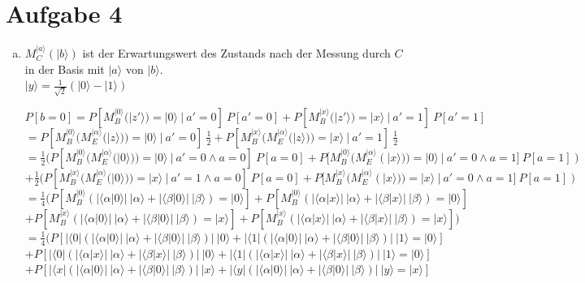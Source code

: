 \documentclass[a4paper]{scrartcl}
\begin{document}
\newpage
\section*{Aufgabe 4}
\begin{enumerate}[a)]

\item $M_C^{|a\rangle}(|b\rangle)$ ist der Erwartungswert des Zustands nach der Messung durch $C$ in der Basis mit $|a\rangle$ von $|b\rangle$.\\
$|y\rangle = \frac{1}{\sqrt{2}} (|0\rangle -|1\rangle)$

$P[b=0] = P[M_B^{|0\rangle}(|z'\rangle)=|0\rangle~|~a'=0]~P[a'=0] + P[M_B^{|x\rangle}(|z'\rangle)=|x\rangle~|~a'=1]~P[a'=1]$\\
$=P[M_B^{|0\rangle}(M_E^{|\alpha \rangle}(|z\rangle))=|0\rangle~|~a'=0]~\frac{1}{2} + P[M_B^{|x\rangle}(M_E^{|\alpha \rangle}(|z\rangle))=|x\rangle~|~a'=1]~\frac{1}{2}$\\
$=\frac{1}{2} (P[M_B^{|0\rangle}(M_E^{|\alpha \rangle}(|0\rangle))=|0\rangle~|~a'=0 \wedge a=0]~P[a=0] + P[M_B^{|0\rangle}(M_E^{|\alpha \rangle}(|x\rangle))=|0\rangle~|~a'=0 \wedge a=1]~P[a=1])$\\
$+\frac{1}{2} (P[M_B^{|x\rangle}(M_E^{|\alpha \rangle}(|0\rangle))=|x\rangle~|~a'=1 \wedge a=0]~P[a=0] + P[M_B^{|x\rangle}(M_E^{|\alpha \rangle}(|x\rangle))=|x\rangle~|~a'=0 \wedge a=1]~P[a=1])$\\
$=\frac{1}{4} (P[M_B^{|0\rangle}(|\langle \alpha|0\rangle|~|\alpha\rangle + |\langle \beta|0\rangle|~|\beta\rangle)=|0\rangle] + P[M_B^{|0\rangle}(|\langle \alpha|x\rangle|~|\alpha\rangle + |\langle \beta|x\rangle|~|\beta\rangle)=|0\rangle]$\\
$+ P[M_B^{|x\rangle}(|\langle \alpha|0\rangle|~|\alpha\rangle + |\langle \beta|0\rangle|~|\beta\rangle)=|x\rangle] + P[M_B^{|x\rangle}(|\langle \alpha|x\rangle|~|\alpha\rangle + |\langle \beta|x\rangle|~|\beta\rangle)=|x\rangle])$\\
$=\frac{1}{4} (P[|\langle 0|(|\langle \alpha|0\rangle|~|\alpha\rangle + |\langle \beta|0\rangle|~|\beta\rangle)|~|0\rangle + |\langle 1|(|\langle \alpha|0\rangle|~|\alpha\rangle + |\langle \beta|0\rangle|~|\beta\rangle)|~|1\rangle=|0\rangle]$\\
$+ P[|\langle 0|(|\langle \alpha|x\rangle|~|\alpha\rangle + |\langle \beta|x\rangle|~|\beta\rangle)|~|0\rangle + |\langle 1|(|\langle \alpha|x\rangle|~|\alpha\rangle + |\langle \beta|x\rangle|~|\beta\rangle)|~|1\rangle =|0\rangle]$\\
$+ P[|\langle x| (|\langle \alpha|0\rangle|~|\alpha\rangle + |\langle \beta|0\rangle|~|\beta\rangle)|~|x\rangle + |\langle y| (|\langle \alpha|0\rangle|~|\alpha\rangle + |\langle \beta|0\rangle|~|\beta\rangle)|~|y\rangle =|x\rangle]$\\

\end{enumerate}
\end{document}
